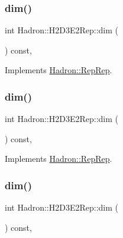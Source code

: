\subsubsection{\texorpdfstring{dim()}{dim()}\hspace{0.1cm}{\footnotesize\ttfamily [3/5]}}
{\footnotesize\ttfamily int Hadron\+::\+H2\+D3\+E2\+Rep\+::dim (\begin{DoxyParamCaption}{ }\end{DoxyParamCaption}) const\hspace{0.3cm}{\ttfamily [inline]}, {\ttfamily [virtual]}}



Implements \mbox{\hyperlink{structHadron_1_1RepRep_a92c8802e5ed7afd7da43ccfd5b7cd92b}{Hadron\+::\+Rep\+Rep}}.

\mbox{\label{structHadron_1_1H2D3E2Rep_ad034b5f609721e406b181c1e1e66ca4a}} 
\subsubsection{\texorpdfstring{dim()}{dim()}\hspace{0.1cm}{\footnotesize\ttfamily [4/5]}}
{\footnotesize\ttfamily int Hadron\+::\+H2\+D3\+E2\+Rep\+::dim (\begin{DoxyParamCaption}{ }\end{DoxyParamCaption}) const\hspace{0.3cm}{\ttfamily [inline]}, {\ttfamily [virtual]}}



Implements \mbox{\hyperlink{structHadron_1_1RepRep_a92c8802e5ed7afd7da43ccfd5b7cd92b}{Hadron\+::\+Rep\+Rep}}.

\mbox{\label{structHadron_1_1H2D3E2Rep_ad034b5f609721e406b181c1e1e66ca4a}} 
\subsubsection{\texorpdfstring{dim()}{dim()}\hspace{0.1cm}{\footnotesize\ttfamily [5/5]}}
{\footnotesize\ttfamily int Hadron\+::\+H2\+D3\+E2\+Rep\+::dim (\begin{DoxyParamCaption}{ }\end{DoxyParamCaption}) const\hspace{0.3cm}{\ttfamily [inline]}, {\ttfamily [virtual]}}



